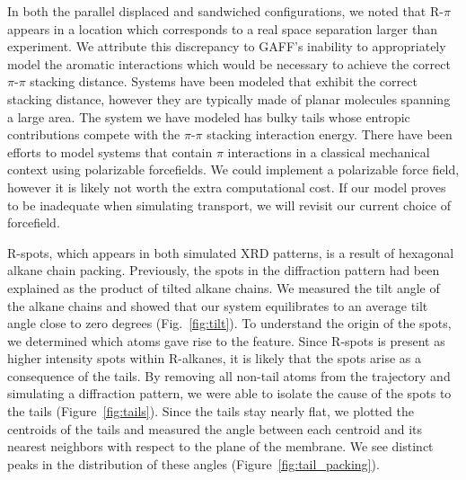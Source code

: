 \documentclass{article}
\begin{document}

  In both the parallel displaced and sandwiched configurations, we noted that
  R-$\pi$ appears in a location which corresponds to a real space separation
  larger than experiment. We attribute this discrepancy to GAFF's inability to
  appropriately model the aromatic interactions which would be necessary to
  achieve the correct $\pi$-$\pi$ stacking distance. Systems have been modeled
  that exhibit the correct stacking distance, however they are typically made of
  planar molecules spanning a large area. The system we have modeled has bulky
  tails whose entropic contributions compete with the $\pi$-$\pi$ stacking
  interaction energy.  There have been efforts to model systems that contain
  $\pi$ interactions in a classical mechanical context using polarizable
  forcefields. We could implement a polarizable force field, however it is likely
  not worth the extra computational cost. If our model proves to be inadequate
  when simulating transport, we will revisit our current choice of forcefield.  

  R-spots, which appears in both simulated XRD patterns, is a result of
  hexagonal alkane chain packing. Previously, the spots in the diffraction
  pattern had been explained as the product of tilted alkane chains. We measured
  the tilt angle of the alkane chains and showed that our system equilibrates to
  an average tilt angle close to zero degrees (Fig.~\ref{fig:tilt}). To understand the
  origin of the spots, we determined which atoms gave rise to the feature. Since
  R-spots is present as higher intensity spots within R-alkanes, it is likely
  that the spots arise as a consequence of the tails. By removing all non-tail atoms from the
  trajectory and simulating a diffraction pattern, we were able to isolate the
  cause of the spots to the tails (Figure~\ref{fig:tails}). Since the tails stay
  nearly flat, we plotted the centroids of the tails and measured the angle
  between each centroid and its nearest neighbors with respect to the plane of
  the membrane. We see distinct peaks in the distribution of these angles 
  (Figure~\ref{fig:tail_packing}).
\end{document}
